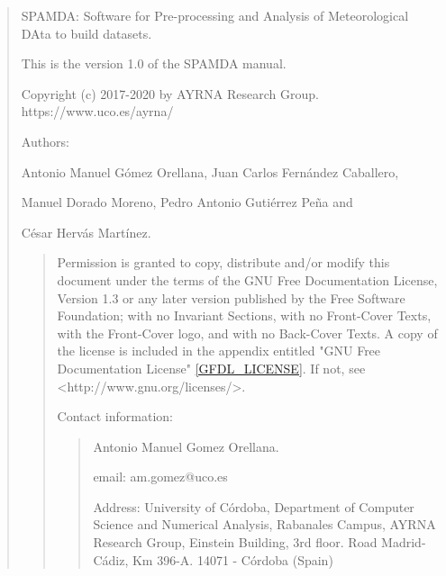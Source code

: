 

\thispagestyle{empty}

\small

\vspace*{\fill} %

\begin{quote}

	SPAMDA: Software for Pre-processing and Analysis of Meteorological DAta to build datasets.

	This is the version 1.0 of the SPAMDA manual.

	Copyright (c) 2017-2020 by AYRNA Research Group. https://www.uco.es/ayrna/

	\hspace{1.005cm}Authors:

	\hspace{1.30cm}Antonio Manuel Gómez Orellana, Juan Carlos Fernández Caballero,

	\hspace{1.30cm}Manuel Dorado Moreno, Pedro Antonio Gutiérrez Peña and 

	\hspace{1.30cm}César Hervás Martínez.

	\begin{quote} %
		Permission is granted to copy, distribute and/or modify this document 
		under the terms of the GNU Free Documentation License, Version 1.3 or any later
		version published by the Free Software Foundation; with no Invariant Sections, 
		with no Front-Cover Texts, with the Front-Cover logo, and with no Back-Cover Texts.
		\newline
		\newline
		A copy of the license is included in the appendix entitled "GNU Free Documentation License" \ref{GFDL_LICENSE}. If not, see <http://www.gnu.org/licenses/>.

		\vspace{0.50cm}
		Contact information:
	
		\begin{quote}
			Antonio Manuel Gomez Orellana.

			email: am.gomez@uco.es

			Address: University of Córdoba, Department of Computer Science and Numerical Analysis, Rabanales Campus, AYRNA Research Group, Einstein Building, 3rd floor. Road Madrid-Cádiz, Km 396-A. 14071 - Córdoba (Spain)
		\end{quote}
        

\end{quote}
\end{quote}
